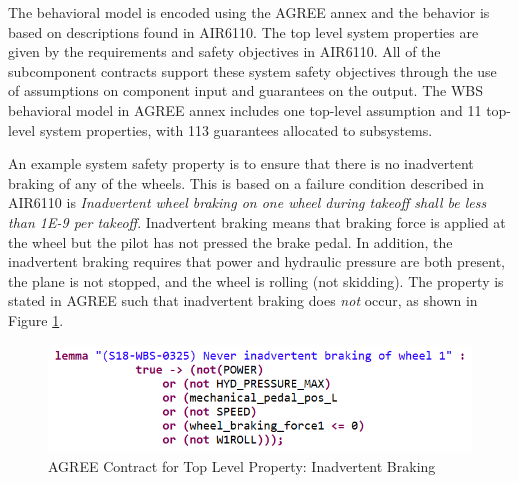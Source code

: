 

The behavioral model is encoded using the AGREE annex and the behavior is based on descriptions found in AIR6110. The top level system properties are given by the requirements and safety objectives in AIR6110. All of the subcomponent contracts support these system safety objectives through the use of assumptions on component input and guarantees on the output. The WBS behavioral model in AGREE annex includes one top-level assumption and  11 top-level system properties, with 113 guarantees allocated to subsystems.  

An example system safety property is to ensure that there is no inadvertent braking of any of the wheels. This is based on a failure condition described in AIR6110 is \textit{Inadvertent wheel braking on one wheel during takeoff shall be less than 1E-9 per takeoff}. 
Inadvertent braking means that braking force is applied at the wheel but the pilot has not pressed the brake pedal.  In addition, the inadvertent braking requires that power and hydraulic pressure are both present, the plane is not stopped, and the wheel is rolling (not skidding). The property is stated in AGREE such that inadvertent braking does \textit{not} occur, as shown in Figure \ref{fig:inadvertent_braking}. 

\begin{figure}[h!]
	\begin{center}
		\includegraphics[width=.7\textwidth]{images/inadvertent_braking.png}
	\end{center}
	\vspace{-0.3in}
	\caption{AGREE Contract for Top Level Property: Inadvertent Braking}
	\label{fig:inadvertent_braking}
\end{figure}


